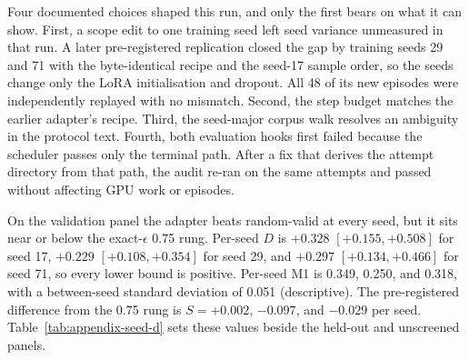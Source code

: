 Four documented choices shaped this run, and only the first bears on what it can show. First, a scope edit to one training seed left seed variance unmeasured in that run. A later pre-registered replication closed the gap by training seeds 29 and 71 with the byte-identical recipe and the seed-17 sample order, so the seeds change only the LoRA initialisation and dropout. All 48 of its new episodes were independently replayed with no mismatch. Second, the step budget matches the earlier adapter's recipe. Third, the seed-major corpus walk resolves an ambiguity in the protocol text. Fourth, both evaluation hooks first failed because the scheduler passes only the terminal path. After a fix that derives the attempt directory from that path, the audit re-ran on the same attempts and passed without affecting GPU work or episodes.

On the validation panel the adapter beats random-valid at every seed, but it sits near or below the exact-$\epsilon$ 0.75 rung. Per-seed $D$ is $+0.328$ $[+0.155, +0.508]$ for seed 17, $+0.229$ $[+0.108, +0.354]$ for seed 29, and $+0.297$ $[+0.134, +0.466]$ for seed 71, so every lower bound is positive. Per-seed M1 is 0.349, 0.250, and 0.318, with a between-seed standard deviation of 0.051 (descriptive). The pre-registered difference from the 0.75 rung is $S = +0.002$, $-0.097$, and $-0.029$ per seed. Table~\ref{tab:appendix-seed-d} sets these values beside the held-out and unscreened panels.

